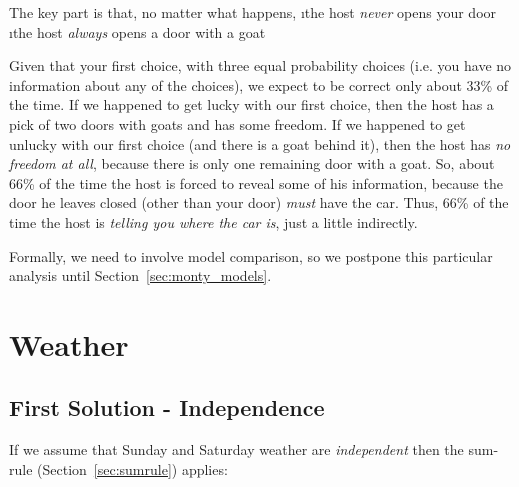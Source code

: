 The key part is that, no matter what happens, 
\be
\i the host {\em never} opens your door
\i the host {\em always} opens a door with a goat
\ee

  Given that your first choice, with three equal probability choices (i.e. you have no information about any of the choices), we expect to be correct only about 33\% of the time.  If we happened to get lucky with our first choice, then the host has a pick of two doors with goats and has some freedom.  If we happened to get unlucky with our first choice (and there is a goat behind it), then the host has \emph{no freedom at all}, because there is only one remaining door with a goat.  So, about 66\% of the time the host is forced to reveal some of his information, because the door he leaves closed (other than your door) {\em must} have the car.  Thus, 66\% of the time the host is {\em telling you where the car is}, just a little indirectly. 

Formally, we need to involve model comparison, so we postpone this particular analysis until Section~\ref{sec:monty_models}. 



\section{Weather}


\subsection{First Solution - Independence}

If we assume that Sunday and Saturday weather are {\em independent} then the sum-rule (Section~\ref{sec:sumrule}) applies:

